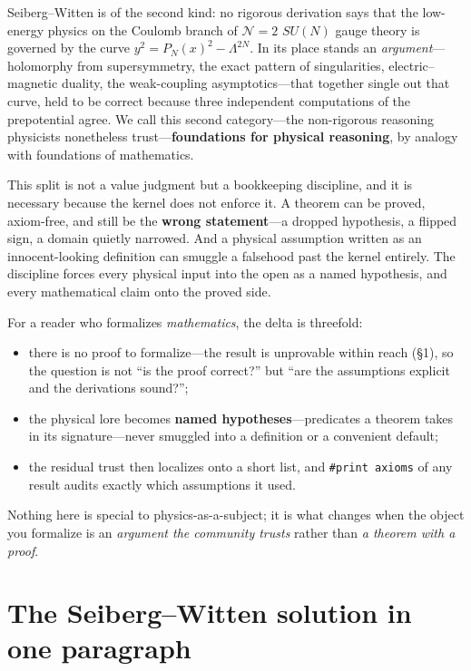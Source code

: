 \documentclass[11pt]{article}
\newcommand{\code}[1]{\texttt{#1}}
\begin{document}
\noindent Seiberg--Witten is of the second kind: no rigorous derivation says that the low-energy
physics on the Coulomb branch of $\mathcal{N}=2$ $SU(N)$ gauge theory is governed by the curve
$y^2 = P_N(x)^2 - \Lambda^{2N}$. In its place stands an \emph{argument}---holomorphy from
supersymmetry, the exact pattern of singularities, electric--magnetic duality, the weak-coupling
asymptotics---that together single out that curve, held to be correct because three independent
computations of the prepotential agree. We call this second category---the non-rigorous reasoning
physicists nonetheless trust---\textbf{foundations for physical reasoning}, by analogy with
foundations of mathematics.

\medskip
\noindent This split is not a value judgment but a bookkeeping discipline, and it is necessary
because the kernel does not enforce it. A theorem can be proved, axiom-free, and still be the
\textbf{wrong statement}---a dropped hypothesis, a flipped sign, a domain quietly narrowed. And
a physical assumption written as an innocent-looking definition can smuggle a falsehood past
the kernel entirely. The discipline forces every physical input into the open as a named
hypothesis, and every mathematical claim onto the proved side.

For a reader who formalizes \emph{mathematics}, the delta is threefold:
\begin{itemize}
\item there is no proof to formalize---the result is unprovable within reach (\S1), so the
question is not ``is the proof correct?'' but ``are the assumptions explicit and the derivations
sound?'';
\item the physical lore becomes \textbf{named hypotheses}---predicates a theorem takes in its
signature---never smuggled into a definition or a convenient default;
\item the residual trust then localizes onto a short list, and \code{\#print axioms} of any
result audits exactly which assumptions it used.
\end{itemize}
Nothing here is special to physics-as-a-subject; it is what changes when the object you
formalize is an \emph{argument the community trusts} rather than \emph{a theorem with a proof}.

\section{The Seiberg--Witten solution in one paragraph}
\end{document}
